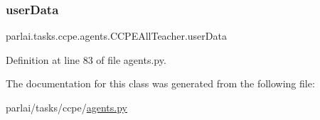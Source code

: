 \mbox{\label{classparlai_1_1tasks_1_1ccpe_1_1agents_1_1CCPEAllTeacher_ac05613e2339436bf69b6319a197a6ce5}} 
\subsubsection{\texorpdfstring{user\+Data}{userData}}
{\footnotesize\ttfamily parlai.\+tasks.\+ccpe.\+agents.\+C\+C\+P\+E\+All\+Teacher.\+user\+Data}



Definition at line 83 of file agents.\+py.



The documentation for this class was generated from the following file\+:\begin{DoxyCompactItemize}
\item 
parlai/tasks/ccpe/\hyperlink{parlai_2tasks_2ccpe_2agents_8py}{agents.\+py}\end{DoxyCompactItemize}
